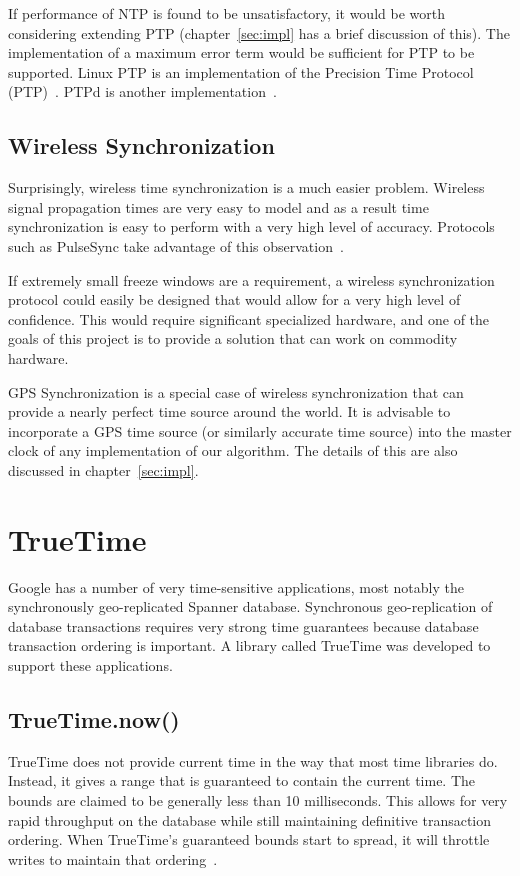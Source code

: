 If performance of NTP is found to be unsatisfactory, it would be worth
considering extending PTP (chapter~\ref{sec:impl} has a brief discussion
of this). The implementation of a maximum error term would be
sufficient for PTP to be supported. Linux PTP is an implementation of
the Precision Time Protocol (PTP)~\citeyearpar{2008}. PTPd is another
implementation~\citeyearpar{2008}.

\subsection{Wireless Synchronization}

Surprisingly, wireless time synchronization is a much easier
problem. Wireless signal propagation times are very easy to model and
as a result time synchronization is easy to perform with a very high
level of accuracy. Protocols such as PulseSync take advantage of this
observation~\citep{Lenzen2010}.

If extremely small freeze windows are a requirement, a wireless
synchronization protocol could easily be designed that would allow for
a very high level of confidence. This would require significant
specialized hardware, and one of the goals of this project is to
provide a solution that can work on commodity hardware. 

GPS Synchronization is a special case of wireless synchronization that
can provide a nearly perfect time source around the world. It is
advisable to incorporate a GPS time source (or similarly accurate time
source) into the master clock of any implementation of our
algorithm. The details of this are also discussed in
chapter~\ref{sec:impl}.

\section{TrueTime}

Google has a number of very time-sensitive applications, most notably
the synchronously geo-replicated Spanner database. Synchronous
geo-replication of database transactions requires very strong time
guarantees because database transaction ordering is important. A
library called TrueTime was developed to support these applications.

\subsection{TrueTime.now()}

TrueTime does not provide current time in the way that most time
libraries do. Instead, it gives a range that is guaranteed to contain
the current time. The bounds are claimed to be generally less than 10
milliseconds. This allows for very rapid throughput on the database
while still maintaining definitive transaction ordering. When
TrueTime's guaranteed bounds start to spread, it will throttle writes
to maintain that ordering~\citep{Corbett2012}.

